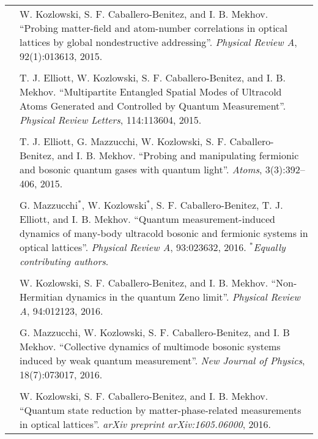 \begin{table}[hbtp!]
  \centering
  \begin{tabular}{r p{13cm}}
    \toprule
    \cite{kozlowski2015} & W. Kozlowski, S. F. Caballero-Benitez, and
    I. B. Mekhov.  ``Probing matter-field and atom-number correlations
    in optical lattices by global nondestructive addressing''.
    \emph{Physical Review A}, 92(1):013613, 2015. \\ \\

    \cite{elliott2015} & T. J. Elliott, W. Kozlowski,
    S. F. Caballero-Benitez, and I. B. Mekhov. ``Multipartite
    Entangled Spatial Modes of Ultracold Atoms Generated and
    Controlled by Quantum Measurement''. \emph{Physical Review
      Letters}, 114:113604, 2015. \\ \\

    \cite{atoms2015} & T. J. Elliott, G. Mazzucchi, W. Kozlowski,
    S. F. Caballero- Benitez, and I. B. Mekhov. ``Probing and
    manipulating fermionic and bosonic quantum gases with quantum
    light''. \emph{Atoms}, 3(3):392–406, 2015. \\ \\

    \cite{mazzucchi2016} & G. Mazzucchi$^*$, W. Kozlowski$^*$,
    S. F. Caballero-Benitez, T. J.  Elliott, and
    I. B. Mekhov. ``Quantum measurement-induced dynamics of many-body
    ultracold bosonic and fermionic systems in optical
    lattices''. \emph{Physical Review A}, 93:023632,
    2016. $^*$\emph{Equally contributing authors}. \\ \\

    \cite{kozlowski2016zeno} & W. Kozlowski, S. F. Caballero-Benitez,
    and I. B. Mekhov. ``Non-Hermitian dynamics in the quantum Zeno
    limit''. \emph{Physical Review A}, 94:012123, 2016. \\ \\

    \cite{mazzucchi2016njp} & G. Mazzucchi, W. Kozlowski,
    S. F. Caballero-Benitez, and I. B Mekhov. ``Collective dynamics of
    multimode bosonic systems induced by weak quantum
    measurement''. \emph{New Journal of Physics}, 18(7):073017,
    2016. \\ \\

    \cite{kozlowski2016phase} & W. Kozlowski, S. F. Caballero-Benitez,
    and I. B. Mekhov. ``Quantum state reduction by
    matter-phase-related measurements in optical
    lattices''. \emph{arXiv preprint arXiv:1605.06000}, 2016. \\

    \bottomrule
  \end{tabular}
\end{table}
